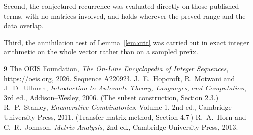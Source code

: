 \documentclass[11pt,a4paper]{article}
\theoremstyle{plain}
\theoremstyle{definition}
\begin{document}
Second, the conjectured recurrence was evaluated directly on those published terms, with no
matrices involved, and holds wherever the proved range and the data overlap.

Third, the annihilation test of Lemma~\ref{lem:crit} was carried out in exact integer
arithmetic on the whole vector rather than on a sampled prefix.

\begin{thebibliography}{9}
 The OEIS Foundation, \emph{The On-Line Encyclopedia of Integer
Sequences}, \url{https://oeis.org}, 2026. Sequence A220923.
 J.~E.~Hopcroft, R.~Motwani and J.~D.~Ullman, \emph{Introduction to Automata
Theory, Languages, and Computation}, 3rd ed., Addison--Wesley, 2006. (The subset
construction, Section 2.3.)
 R.~P.~Stanley, \emph{Enumerative Combinatorics}, Volume 1, 2nd ed.,
Cambridge University Press, 2011. (Transfer-matrix method, Section 4.7.)
 R.~A.~Horn and C.~R.~Johnson, \emph{Matrix Analysis}, 2nd ed., Cambridge
University Press, 2013.
\end{thebibliography}
\end{document}
